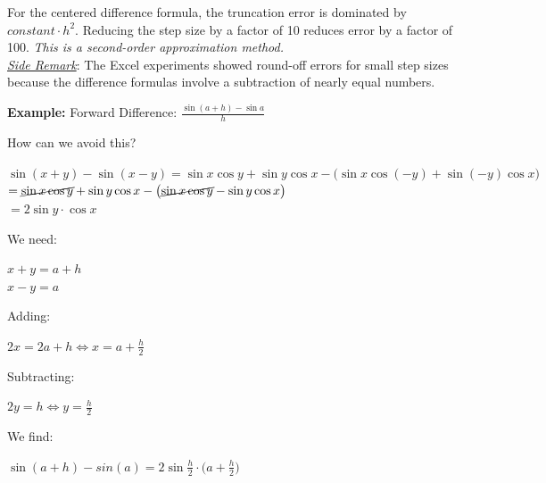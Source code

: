 \documentclass[a4paper,12pt]{report}
\begin{document}
	\noindent For the centered difference formula, the truncation error is dominated by $constant\cdot h^2$.  Reducing the step size by a factor of 10 reduces error by a factor of 100.  \textit{This is a second-order approximation method.}\\
	
\underline{\textit{Side Remark}}: The Excel experiments showed round-off errors for small step sizes because the difference formulas involve a subtraction of nearly equal numbers.

\begin{center}
	\textbf{Example:} Forward Difference: \qquad \Large $\frac{\sin(a+h) - \sin a}{h}$
\end{center}

	\noindent How can we avoid this?
	
\begin{center}
	$\sin (x+y) - \sin (x-y) = \sin x \cos y + \sin y \cos x - \big( \sin x \cos(-y) + \sin(-y) \cos x \big)$\\
	\bigskip
	$= \cancel{\sin x \cos y} + \sin y \cos x - \big( \cancel{ \sin x \cos y } - \sin y \cos x \big)$\\
	\bigskip
	$= 2 \sin y \cdot \cos x$\\
\end{center}
	
	\noindent We need:

\begin{center}
	\vspace{-5mm}
	$x+y = a + h$\\
	$x-y = a$\\
	\medskip
\end{center}

	\noindent Adding:
	
\begin{center}
	\vspace{-5mm}
	$2x = 2a+h \Leftrightarrow x = a + \frac{h}{2}$\\
	\medskip
\end{center}
	
	\noindent Subtracting:
	
\begin{center}
	\vspace{-5mm}
	$2y = h \Leftrightarrow y = \frac{h}{2}$\\
	\medskip
\end{center}

	\noindent We find:
	
\begin{center}
		\vspace{-5mm}
		$\sin (a+h) - sin (a) = 2 \sin \frac{h}{2} \cdot \big( a + \frac{h}{2} \big)$\\
		\medskip
\end{center}
\end{document}

